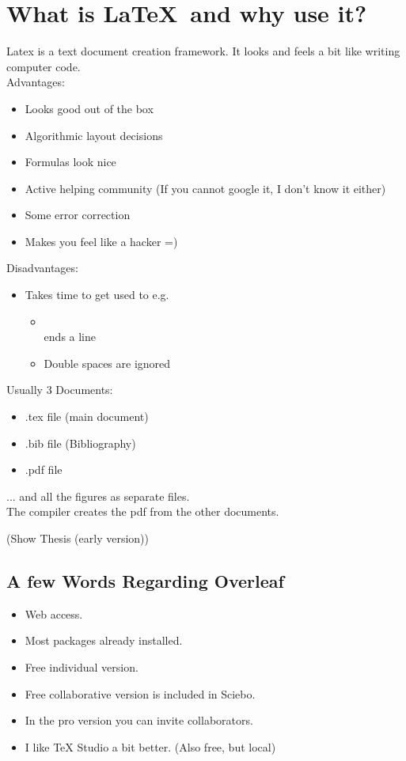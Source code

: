 \documentclass[]{article}
\newcommand{\commandToText}[1]{\texttt{\string#1}}
\begin{document}
\newpage

\section{What is \LaTeX \ and why use it?}
Latex is a text document creation framework. It looks and feels a bit like writing computer code. \\
Advantages:
\begin{itemize}
  \item Looks good out of the box
  \item Algorithmic layout decisions
  \item Formulas look nice
  \item Active helping community (If you cannot google it, I don't know it either)
  \item Some error correction
  \item Makes you feel like a hacker =)
\end{itemize}
Disadvantages:
\begin{itemize}
  \item Takes time to get used to e.g.
        \begin{itemize}
          \item \commandToText{\\} ends a line
          \item Double spaces are ignored
        \end{itemize}
\end{itemize}

\noindent Usually 3 Documents:
\begin{itemize}
  \item .tex file (main document)
  \item .bib file (Bibliography)
  \item .pdf file
\end{itemize}
... and all the figures as separate files.\\
The compiler creates the pdf from the other documents.

(Show Thesis (early version))

\subsection{A few Words Regarding Overleaf}
\begin{itemize}
  \item Web access.
  \item Most packages already installed.
  \item Free individual version.
  \item Free collaborative version is included in Sciebo.
  \item In the pro version you can invite collaborators.
  \item I like TeX Studio a bit better. (Also free, but local)
\end{itemize}
\end{document}
